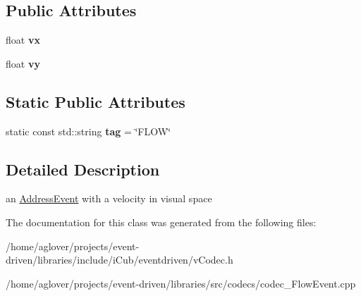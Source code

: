 \subsection*{Public Attributes}
\begin{DoxyCompactItemize}
\item 
float {\bfseries vx}\hypertarget{classev_1_1FlowEvent_a614490d12ab9767e546e2929a4c7a65e}{}\label{classev_1_1FlowEvent_a614490d12ab9767e546e2929a4c7a65e}

\item 
float {\bfseries vy}\hypertarget{classev_1_1FlowEvent_a20416e333c9f0258a2a1bbb49fb14989}{}\label{classev_1_1FlowEvent_a20416e333c9f0258a2a1bbb49fb14989}

\end{DoxyCompactItemize}
\subsection*{Static Public Attributes}
\begin{DoxyCompactItemize}
\item 
static const std\+::string {\bfseries tag} = \char`\"{}F\+L\+OW\char`\"{}\hypertarget{classev_1_1FlowEvent_a583ae9aaa6cbcbe1779eab526b5df1de}{}\label{classev_1_1FlowEvent_a583ae9aaa6cbcbe1779eab526b5df1de}

\end{DoxyCompactItemize}


\subsection{Detailed Description}
an \hyperlink{classev_1_1AddressEvent}{Address\+Event} with a velocity in visual space 

The documentation for this class was generated from the following files\+:\begin{DoxyCompactItemize}
\item 
/home/aglover/projects/event-\/driven/libraries/include/i\+Cub/eventdriven/v\+Codec.\+h\item 
/home/aglover/projects/event-\/driven/libraries/src/codecs/codec\+\_\+\+Flow\+Event.\+cpp\end{DoxyCompactItemize}

